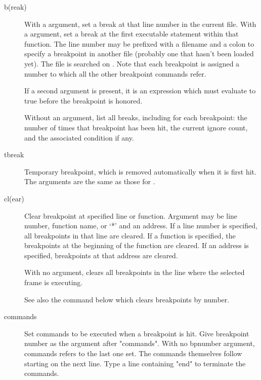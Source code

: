 \begin{description}
\item[b(reak) ]

With a  argument, set a break at that line number in the
current file.  With a  argument, set a break at the
first executable statement within that function.  The line number may
be prefixed with a filename and a colon to specify a breakpoint in
another file (probably one that hasn't been loaded yet).  The file is
searched on .  Note that each breakpoint is assigned a
number to which all the other breakpoint commands refer.

If a second argument is present, it is an expression which must
evaluate to true before the breakpoint is honored.

Without an argument, list all breaks, including for each breakpoint:
the number of times that breakpoint has been hit, the current
ignore count, and the associated condition if any.

\item[tbreak ]

Temporary breakpoint, which is removed automatically when it is
first hit.  The arguments are the same as those for .

\item[cl(ear) ]

Clear breakpoint at specified line or function.  Argument may be line
number, function name, or `*' and an address.  If a line number is
specified, all breakpoints in that line are cleared.  If a function is
specified, the breakpoints at the beginning of the function are cleared.  If an
address is specified, breakpoints at that address are cleared.

With no argument, clears all breakpoints in the line where the selected
frame is executing.

See also the  command below which clears breakpoints by
number.

\item[commands ]

Set commands to be executed when a breakpoint is hit.
Give breakpoint number as the argument after "commands".
With no bpnumber argument, commands refers to the last one set.
The commands themselves follow starting on the next line.
Type a line containing "end" to terminate the commands.


\end{description}
